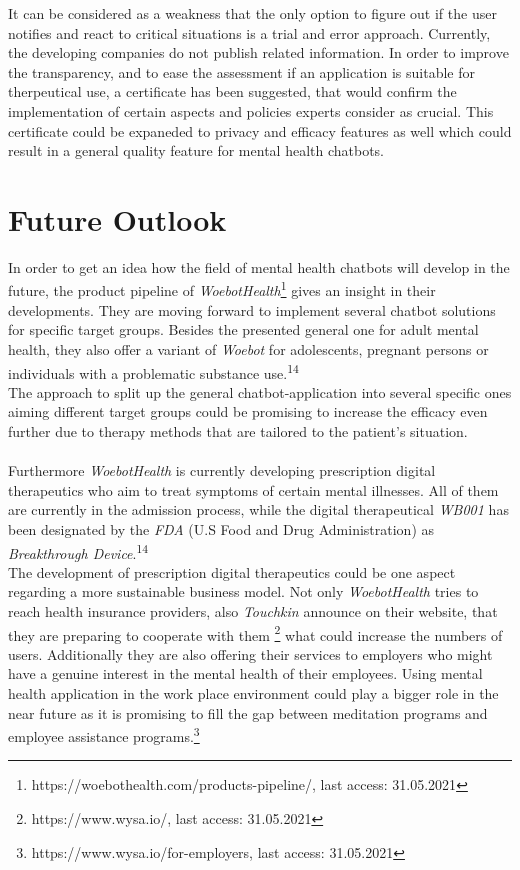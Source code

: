 \documentclass[sigconf, nonacm]{acmart}
\begin{document}
It can be considered as a weakness that the only option to figure out if the user notifies and react to critical situations is a trial and error approach. Currently, the developing companies do not publish related information. In order to improve the transparency, and to ease the assessment if an application is suitable for therpeutical use, a certificate has been suggested, that would confirm the implementation of certain aspects and policies experts consider as crucial.
This certificate could be expaneded to privacy and efficacy features as well which could result in a general quality feature for mental health chatbots.

\section{Future Outlook}
In order to get an idea how the field of mental health chatbots will develop in the future, the product pipeline of \emph{WoebotHealth}\footnote{https://woebothealth.com/products-pipeline/, last access: 31.05.2021} gives an insight in their developments. They are moving forward to implement several chatbot solutions for specific target groups. Besides the presented general one for adult mental health, they also offer a variant of \emph{Woebot} for adolescents, pregnant persons or 
individuals with a problematic substance use.\textsuperscript{14}
\\
The approach to split up the general chatbot-application into several specific ones aiming different target groups could be promising to increase the efficacy even further due to therapy methods that are tailored to the patient's situation. 
\\\\
Furthermore \emph{WoebotHealth} is currently developing prescription digital therapeutics who aim to treat symptoms of certain mental illnesses. All of them are currently in the admission process, while the digital therapeutical \emph{WB001} has been designated by the \emph{FDA} (U.S Food and Drug Administration) as \emph{Breakthrough Device}.\textsuperscript{14}
\\
The development of prescription digital therapeutics could be one aspect regarding a more sustainable business model. Not only \emph{WoebotHealth} tries to reach health insurance providers, also \emph{Touchkin} announce on their website, that they are preparing to cooperate with them \footnote{https://www.wysa.io/, last access: 31.05.2021} what could increase the numbers of users.
Additionally they are also offering their services to employers who might have a genuine interest in the mental health of their employees. Using mental health application in the work place environment could play a bigger role in the near future as it is promising to fill the gap between meditation programs and employee assistance programs.\footnote{https://www.wysa.io/for-employers, last access: 31.05.2021}
\end{document}
